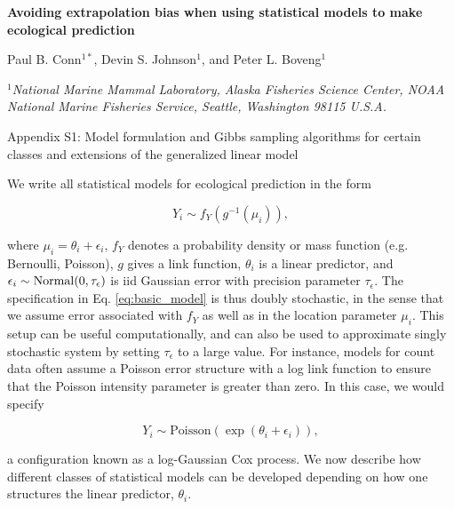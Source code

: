 \documentclass[12pt,fleqn]{article}
\begin{document}
\begin{center} \bf {\large Avoiding extrapolation bias when using statistical models to make ecological prediction}

\vspace{0.7cm}
Paul B. Conn$^{1*}$, Devin S. Johnson$^1$, and Peter L. Boveng$^1$
\end{center}
\vspace{0.5cm}

\rm
\small

\it $^1$National Marine Mammal Laboratory, Alaska Fisheries Science Center,
NOAA National Marine Fisheries Service,
Seattle, Washington 98115 U.S.A.\\

\rm \begin{flushleft}

\raggedbottom
\vspace{.5in}

\begin{center}
Appendix S1: Model formulation and Gibbs sampling algorithms for certain classes and extensions of the generalized linear model
\bigskip
\end{center}
\vspace{.3in}

\doublespacing



We write all statistical models for ecological prediction in the form
\begin{linenomath*}
\begin{equation}
  \label{eq:basic_model}
  Y_i \sim f_Y(g^{-1}(\mu_i)),
\end{equation}
\end{linenomath*}
where $\mu_i=\theta_i + \epsilon_i$, $f_Y$ denotes a probability density or mass function (e.g. Bernoulli, Poisson), $g$ gives a link function,
$\theta_i$ is a linear predictor, and $\epsilon_i \sim {\rm Normal}(0,\tau_\epsilon)$ is iid Gaussian error with precision parameter $\tau_\epsilon$.  The specification in Eq. \ref{eq:basic_model} is thus doubly stochastic, in the sense that we assume error associated with $f_Y$ as well as in the location parameter $\mu_i$.  This setup can be useful computationally, and can also be used to approximate singly stochastic system by setting $\tau_\epsilon$ to a large value.  For instance, models for count data often assume a Poisson error structure with a log link function to ensure that the Poisson intensity parameter is greater than zero.  In this case, we would specify
\begin{linenomath*}
\begin{equation*}
  Y_i \sim \mathrm{Poisson}(\exp(\theta_i + \epsilon_i)),
\end{equation*}
\end{linenomath*}
a configuration known as a log-Gaussian Cox process.
We now describe how different classes of statistical models can be developed depending on how one structures the linear predictor, $\theta_i$.


\end{flushleft}
\end{document}
